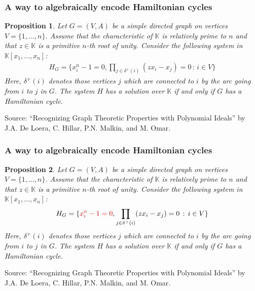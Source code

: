 \documentclass{beamer}
\newtheorem*{prop}{Proposition}
\begin{document}
\begin{frame}
\frametitle{A way to algebraically encode Hamiltonian cycles}
\begin{prop}
  Let $G = (V,A)$ be a simple directed graph on vertices $V = \{1, \ldots, n\}$. Assume that the characteristic of $\mathbb{K}$ is relatively prime to $n$ and that {\color{red} $z \in \mathbb{K}$ is a primitive $n$-th root of unity}. Consider the following system in $\mathbb{K}[x_1, \ldots, x_n]$:
  \begin{align*}
    H_G = \{x_i^n - 1 = 0, \prod_{j \in \delta^+(i)} (z x_i - x_j) = 0 \, : \, i \in V\}
  \end{align*}
  Here, $\delta^+(i)$ denotes those vertices $j$ which are connected to $i$ by the arc going from $i$ to $j$ in $G$. The system $H$ has a solution over $\mathbb{K}$ if and only if $G$ has a Hamiltonian cycle.
\end{prop}
Source: ``Recognizing Graph Theoretic Properties with Polynomial Ideals'' by J.A. De Loera, C. Hillar, P.N. Malkin, and M. Omar.
\end{frame}

\begin{frame}
\frametitle{A way to algebraically encode Hamiltonian cycles}
\begin{prop}
  Let $G = (V,A)$ be a simple directed graph on vertices $V = \{1, \ldots, n\}$. Assume that the characteristic of $\mathbb{K}$ is relatively prime to $n$ and that $z \in \mathbb{K}$ is a primitive $n$-th root of unity. Consider the following system in $\mathbb{K}[x_1, \ldots, x_n]$:
  \begin{align*}
    H_G = \{{\color{red} x_i^n - 1 = 0}, \prod_{j \in \delta^+(i)} (z x_i - x_j) = 0 \, : \, i \in V\}
  \end{align*}
  Here, $\delta^+(i)$ denotes those vertices $j$ which are connected to $i$ by the arc going from $i$ to $j$ in $G$. The system $H$ has a solution over $\mathbb{K}$ if and only if $G$ has a Hamiltonian cycle.
\end{prop}
Source: ``Recognizing Graph Theoretic Properties with Polynomial Ideals'' by J.A. De Loera, C. Hillar, P.N. Malkin, and M. Omar.
\end{frame}
\end{document}
